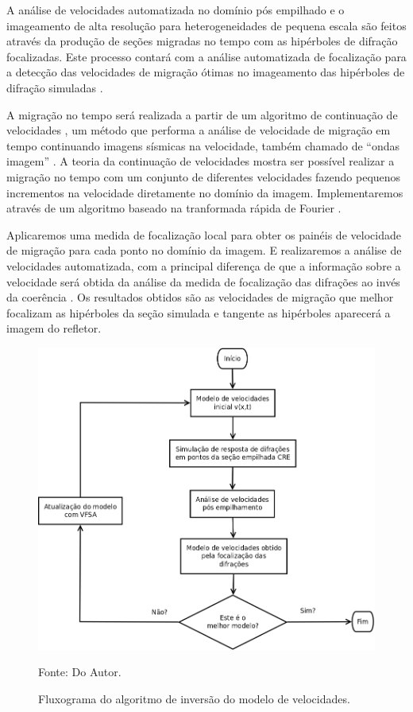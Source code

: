 A análise de velocidades automatizada no domínio pós empilhado e o imageamento de alta resolução
para heterogeneidades de pequena escala são feitos através da produção de seções migradas no tempo 
com as hipérboles de difração focalizadas. 
Este processo contará com a análise automatizada de focalização para a detecção das
velocidades de migração ótimas no imageamento das hipérboles de difração simuladas \cite{sep_dif}.

A migração no tempo será realizada a partir de um algoritmo de continuação de velocidades \cite{fomel2003a},
um método que performa
a análise de velocidade de migração em tempo continuando imagens sísmicas na velocidade, também chamado de
``ondas imagem'' \cite{hubral1996}. A teoria da continuação de velocidades mostra ser possível realizar a migração no tempo
com um conjunto de diferentes velocidades fazendo pequenos incrementos na velocidade diretamente no domínio da imagem.
Implementaremos através de um algoritmo baseado na tranformada rápida de Fourier \cite{bfomel2003}.

Aplicaremos uma medida de focalização local para obter os painéis de velocidade de migração para cada ponto no domínio da
imagem. E realizaremos a análise de velocidades automatizada, com a principal diferença de que a informação sobre a velocidade
será obtida da análise da medida de focalização das difrações ao invés da coerência \cite{sep_dif}.
Os resultados obtidos são as velocidades de migração que melhor focalizam as hipérboles da seção simulada e tangente as hipérboles
aparecerá a imagem do refletor.

\begin{figure}[htb]
\caption{Fluxograma do algoritmo de inversão do modelo de velocidades.}
\begin{center}
\includegraphics[scale=0.30]{images/fluxoVel.png}
\vspace{-0.3cm}
\end{center}
\begin{center}
 Fonte: Do Autor.
\end{center}
\label{fig:8.4}
\end{figure}